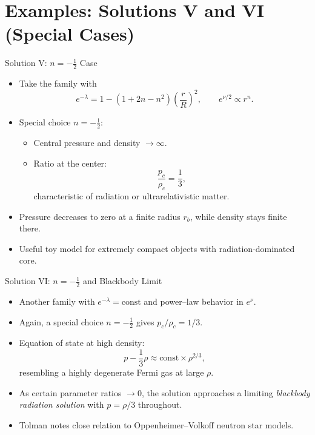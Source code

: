 \documentclass[11pt]{beamer}
\begin{document}
\section{Examples: Solutions V and VI (Special Cases)}

\begin{frame}{Solution V: $n=-\tfrac{1}{2}$ Case}
  \small
  \begin{itemize}
    \item Take the family with
      \[
        e^{-\lambda} = 1 - (1+2n-n^2)\left(\frac{r}{R}\right)^2,
        \qquad e^{\nu/2} \propto r^n .
      \]
    \item Special choice $n=-\tfrac{1}{2}$:
      \begin{itemize}
        \item Central pressure and density $\to \infty$.
        \item Ratio at the center:
          \[
            \frac{p_c}{\rho_c} = \frac{1}{3},
          \]
          characteristic of radiation or ultrarelativistic matter.
      \end{itemize}
    \item Pressure decreases to zero at a finite radius $r_b$, while density stays finite there.
    \item Useful toy model for extremely compact objects with radiation-dominated core.
  \end{itemize}
\end{frame}

\begin{frame}{Solution VI: $n=-\tfrac{1}{2}$ and Blackbody Limit}
  \small
  \begin{itemize}
    \item Another family with $e^{-\lambda} = \text{const}$ and power–law behavior in $e^\nu$.
    \item Again, a special choice $n=-\tfrac{1}{2}$ gives $p_c/\rho_c = 1/3$.
    \item Equation of state at high density:
      \[
        p - \frac{1}{3}\rho \approx \text{const}\times \rho^{2/3},
      \]
      resembling a highly degenerate Fermi gas at large $\rho$.
    \item As certain parameter ratios $\to 0$, the solution approaches a limiting
      \emph{blackbody radiation solution} with $p=\rho/3$ throughout.
    \item Tolman notes close relation to Oppenheimer–Volkoff neutron star models.
  \end{itemize}
\end{frame}
\end{document}
